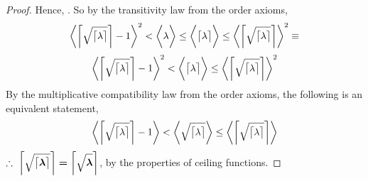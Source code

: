 \documentclass[a4paper, 12pt]{article}
\theoremstyle{plain}
\begin{document}
\begin{proof}
    Hence,
    .
    So by the transitivity law from the order axioms,
    \begin{equation*}
        \bigg \langle
            \bigg \lceil
                \sqrt{ \strut \big \lceil \lambda \big \rceil }
            \bigg \rceil
                -
            1
        \bigg \rangle
            ^2
            <
        \bigg \langle
            \lambda
        \bigg \rangle
            \leq
        \bigg \langle
            \big \lceil \lambda \big \rceil
        \bigg \rangle
            \leq
        \bigg \langle
            \bigg \lceil
                \sqrt{ \strut \big \lceil \lambda \big \rceil }
            \bigg \rceil
        \bigg \rangle
            ^2
            \equiv
    \end{equation*}
    \begin{equation*}
        \bigg \langle
            \bigg \lceil
                \sqrt{ \strut \big \lceil \lambda \big \rceil }
            \bigg \rceil
                -
            1
        \bigg \rangle
            ^2
            <
        \bigg \langle
            \big \lceil \lambda \big \rceil
        \bigg \rangle
            \leq
        \bigg \langle
            \bigg \lceil
                \sqrt{ \strut \big \lceil \lambda \big \rceil }
            \bigg \rceil
        \bigg \rangle
            ^2
    \end{equation*}
    By the multiplicative compatibility law from the order axioms,
    the following is an equivalent statement,
    \begin{equation*}
        \bigg \langle
            \bigg \lceil
                \sqrt{ \strut \big \lceil \lambda \big \rceil }
            \bigg \rceil
                -
            1
        \bigg \rangle
            <
        \bigg \langle
            \sqrt{ \strut \big \lceil \lambda \big \rceil }
        \bigg \rangle
            \leq
        \bigg \langle
            \bigg \lceil
                \sqrt{ \strut \big \lceil \lambda \big \rceil }
            \bigg \rceil
        \bigg \rangle
    \end{equation*}
    $\therefore \text{\space} \bm{
        \bigg \lceil 
            \sqrt{ \strut \big \lceil \lambda \big \rceil }
        \bigg \rceil 
            = 
        \bigg \lceil \sqrt{ \strut \lambda } \bigg \rceil
    }$, by the properties of ceiling functions.
\color{lightgray} \end{proof}
\pagebreak
\end{document}
